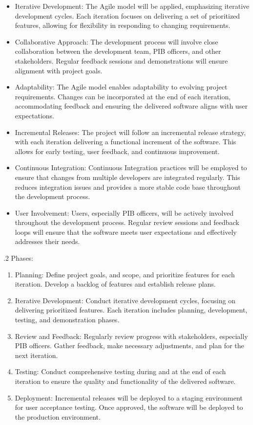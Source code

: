 \documentclass[12pt]{article}
\begin{document}
\begin{itemize}
\item Iterative Development: The Agile model will be applied, emphasizing iterative development cycles. Each iteration focuses on delivering a set of prioritized features, allowing for flexibility in responding to changing requirements.
\item Collaborative Approach: The development process will involve close collaboration between the development team, PIB officers, and other stakeholders. Regular feedback sessions and demonstrations will ensure alignment with project goals.
\item Adaptability: The Agile model enables adaptability to evolving project requirements. Changes can be incorporated at the end of each iteration, accommodating feedback and ensuring the delivered software aligns with user expectations.
\item Incremental Releases: The project will follow an incremental release strategy, with each iteration delivering a functional increment of the software. This allows for early testing, user feedback, and continuous improvement.
\item Continuous Integration: Continuous Integration practices will be employed to ensure that changes from multiple developers are integrated regularly. This reduces integration issues and provides a more stable code base throughout the development process.
\item User Involvement: Users, especially PIB officers, will be actively involved throughout the development process. Regular review sessions and feedback loops will ensure that the software meets user expectations and effectively addresses their needs.
\end{itemize}

.2 Phases:
\begin{enumerate}
\item Planning: Define project goals, and scope, and prioritize features for each iteration. Develop a backlog of features and establish release plans.
\item Iterative Development: Conduct iterative development cycles, focusing on delivering prioritized features. Each iteration includes planning, development, testing, and demonstration phases.
\item Review and Feedback: Regularly review progress with stakeholders, especially PIB officers. Gather feedback, make necessary adjustments, and plan for the next iteration.
\item Testing: Conduct comprehensive testing during and at the end of each iteration to ensure the quality and functionality of the delivered software.
\item Deployment: Incremental releases will be deployed to a staging environment for user acceptance testing. Once approved, the software will be deployed to the production environment.
\end{enumerate}
\end{document}
